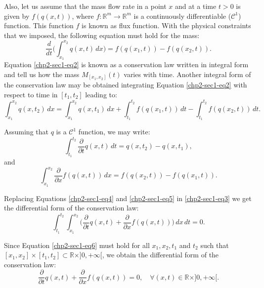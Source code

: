 Also, let us assume that the mass flow rate in a point $x$ and at a time 
$t > 0$ is given by ${f}({q}(x,t))$, where ${f}:\mathbb{R}^m \to \mathbb{R}^m$ is 
a continuously differentiable ($\mathcal{C}^1$) function. This function ${f}$ is known as flux function.
With the physical constraints that we imposed, the following equation must hold for the mass:
\begin{equation}
	\label{chp2-sec1-eq2}
	\frac{d}{dt} \bigg( \int_{x_1}^{x_2} {q}(x,t) \,dx \bigg) = 
	{f}({q}(x_1,t)) - {f}({q}(x_2,t)) .
\end{equation}
Equation \eqref{chp2-sec1-eq2} is known as a conservation law written in integral form and tell us how the mass 
${M}_{[x_1, x_2]}(t)$ varies with time. Another integral form of the conservation law may be obtained integrating
Equation \eqref{chp2-sec1-eq2} with respect to time in $[t_1, t_2]$ leading to: 
\begin{equation}
	\label{chp2-sec1-eq3}
	\int_{x_1}^{x_2} {q}(x, t_2) \,dx = 
	\int_{x_1}^{x_2} {q}(x, t_1) \,dx + 
	\int_{t_1}^{t_2} {f}({q}(x_1, t)) \,dt -
	\int_{t_1}^{t_2}{f}({q}(x_2, t)) \,dt .
\end{equation}

Assuming that ${q}$ is a $\mathcal{C}^1$ function, we may write:
\begin{equation}
	\label{chp2-sec1-eq4}
	\int_{t_1}^{t_2} 
	\frac{\partial}{\partial t} {q}(x,t) \,dt
	= {q}(x, t_2) - {q}(x, t_1) ,
\end{equation}
and
\begin{equation}
	\label{chp2-sec1-eq5}
	\int_{x_1}^{x_2} \frac{\partial}{\partial x}{f}({q}(x,t)) \,dx 
	= {f}({q}(x_2, t)) -
	{f}( {q}(x_1, t)) .
\end{equation}

Replacing Equations \eqref{chp2-sec1-eq4} and \eqref{chp2-sec1-eq5}
in \eqref{chp2-sec1-eq3} we get the differential form of the conservation law:
\begin{equation}
	\label{chp2-sec1-eq6}
	\int_{t_1}^{t_2} \int_{x_1}^{x_2} 
	\bigg( \frac{\partial}{\partial t}{q}(x, t) 
	+ \frac{\partial}{\partial x} {f}({q}(x, t)) \bigg) 
	\,dx \,dt  = 0.
\end{equation}

Since Equation \eqref{chp2-sec1-eq6} must hold for all $x_1, x_2, t_1$ and $t_2$ such that
$[x_1, x_2] \times [t_1, t_2] \subset \mathbb{R}\times ]0, +\infty[$, we obtain the differential form of the conservation law:
\begin{equation}
	\label{chp2-sec1-eq7}
	\frac{\partial}{\partial t}{q}(x, t) +
	\frac{\partial}{\partial x} {f}({q}(x, t))
	= 0, \quad \forall (x,t) \in \mathbb{R}\times ]0, +\infty[. 
\end{equation}

